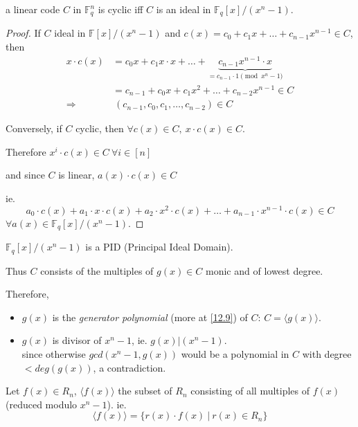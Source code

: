 \documentclass{article}
\theoremstyle{definition}
\newenvironment{thm}[1]
{\renewcommand\theinnerthm{#1}\innerthm}
{\endinnerthm}
\newenvironment{cor}[1]
{\renewcommand\theinnercor{#1}\innercor}
{\endinnercor}
\begin{document}
\vspace{0.5cm}
\begin{thm}{6.1.3}
  a linear code $C$ in $\mathbb{F}_q^n$ is cyclic iff $C$ is an ideal in $\mathbb{F}_q[x]/(x^n -1)$.
\end{thm}
\begin{proof}
  If $C$ ideal in $\mathbb{F}[x]/(x^n -1)$ and $c(x)=c_0 + c_1 x + \ldots + c_{n-1}x^{n-1} \in C$, then
  \begin{align*}
    x \cdot c(x) &= c_0 x + c_1 x \cdot x + \ldots + \underbrace{c_{n-1} x^{n-1} \cdot x}_{=c_{n-1} \cdot 1 \pmod{x^n-1}}\\
                 &= c_{n-1} + c_0 x + c_1 x^2 + \ldots + c_{n-2} x^{n-1} \in C\\
    \Longrightarrow&~ (c_{n-1}, c_0, c_1, \ldots, c_{n-2}) \in C
  \end{align*}

  \vspace{0.5cm}
  Conversely, if $C$ cyclic, then $\forall c(x) \in C,~ x \cdot c(x) \in C$.

  Therefore $x^i \cdot c(x) \in C ~\forall i \in [n]$

  and since $C$ is linear, $a(x) \cdot c(x) \in C$

  ie.
  $$a_0 \cdot c(x) + a_1 \cdot x \cdot c(x) + a_2 \cdot x^2 \cdot c(x) + \ldots + a_{n-1} \cdot x^{n-1} \cdot c(x) \in C$$
  $\forall a(x) \in \mathbb{F}_q[x]/(x^n-1)$.
\end{proof}

\begin{cor}{}
  $\mathbb{F}_q[x]/(x^n -1)$ is a PID (Principal Ideal Domain).

  Thus $C$ consists of the multiples of $g(x) \in C$ monic and of lowest degree.

  Therefore,
  \begin{itemize}
    \item[$\Longrightarrow$] $g(x)$ is the \emph{generator polynomial} (more at \ref{12.9}) of $C$: $C= \langle g(x) \rangle$.
    \item[$\Longrightarrow$] $g(x)$ is divisor of $x^n -1$, ie. $g(x) | (x^n-1)$.\\
      since otherwise $gcd(x^n-1, g(x))$ would be a polynomial in $C$ with degree $< deg(g(x))$, a contradiction.

  \end{itemize}
\end{cor}
\vspace{0.5cm}

\vspace{1.0cm}
Let $f(x) \in R_n$, $\langle f(x) \rangle$ the subset of $R_n$ consisting of all multiples of $f(x)$ (reduced modulo $x^n-1$). ie.
$$\langle f(x) \rangle = \{ r(x) \cdot f(x) ~|~ r(x) \in R_n \}$$
\end{document}
